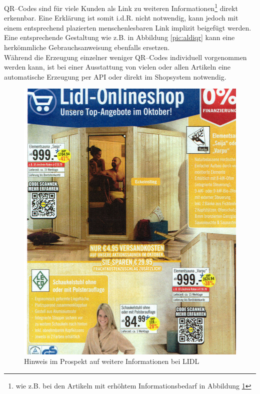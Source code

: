 QR--Codes sind für viele Kunden als Link zu weiteren Informationen\footnote{wie z.B. bei den Artikeln mit erhöhtem Informationsbedarf in Abbildung \ref{pic:lidlqr}} direkt erkennbar. Eine Erklärung ist somit i.d.R. nicht notwendig, kann jedoch mit einem entsprechend plazierten menschenlesbaren Link implizit beigefügt werden. Eine entsprechende Gestaltung wie z.B. in Abbildung \ref{pic:aldiqr} kann eine herkömmliche Gebrauchsanweisung ebenfalls ersetzen.
\\Während die Erzeugung einzelner weniger QR--Codes individuell vorgenommen werden kann, ist bei einer Ausstattung von vielen oder allen Artikeln eine automatische Erzeugung per \ac{API} oder direkt im Shopsystem notwendig.

\begin{minipage}[t]{0.4\textwidth}
\begin{figure}[H]
\begin{center}
\includegraphics[width=\textwidth]{LIDL-QR.jpg}
\caption{Hinweis im Prospekt auf weitere Informationen bei LIDL}
\label{pic:lidlqr}
\end{center}
\end{figure}
\end{minipage}
